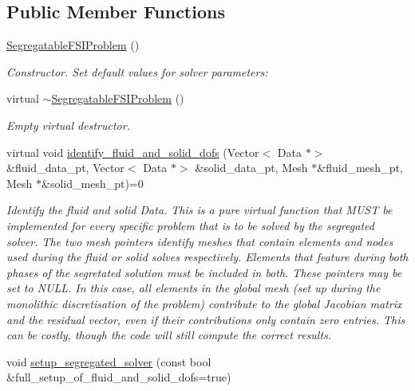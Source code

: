 \subsection*{Public Member Functions}
\begin{DoxyCompactItemize}
\item 
\hyperlink{classoomph_1_1SegregatableFSIProblem_aabbe220c15e7a348a28d54be805ca8d8}{Segregatable\+F\+S\+I\+Problem} ()
\begin{DoxyCompactList}\small\item\em Constructor. Set default values for solver parameters\+: \end{DoxyCompactList}\item 
virtual \hyperlink{classoomph_1_1SegregatableFSIProblem_aa3c69a4078b02d251e4532e73d5820aa}{$\sim$\+Segregatable\+F\+S\+I\+Problem} ()
\begin{DoxyCompactList}\small\item\em Empty virtual destructor. \end{DoxyCompactList}\item 
virtual void \hyperlink{classoomph_1_1SegregatableFSIProblem_a60f719990547949019c8645a4b3a6c6e}{identify\+\_\+fluid\+\_\+and\+\_\+solid\+\_\+dofs} (Vector$<$ Data $\ast$$>$ \&fluid\+\_\+data\+\_\+pt, Vector$<$ Data $\ast$$>$ \&solid\+\_\+data\+\_\+pt, Mesh $\ast$\&fluid\+\_\+mesh\+\_\+pt, Mesh $\ast$\&solid\+\_\+mesh\+\_\+pt)=0
\begin{DoxyCompactList}\small\item\em Identify the fluid and solid Data. This is a pure virtual function that M\+U\+ST be implemented for every specific problem that is to be solved by the segregated solver. The two mesh pointers identify meshes that contain elements and nodes used during the fluid or solid solves respectively. Elements that feature during both phases of the segretated solution must be included in both. These pointers may be set to N\+U\+LL. In this case, all elements in the global mesh (set up during the monolithic discretisation of the problem) contribute to the global Jacobian matrix and the residual vector, even if their contributions only contain zero entries. This can be costly, though the code will still compute the correct results. \end{DoxyCompactList}\item 
void \hyperlink{classoomph_1_1SegregatableFSIProblem_a12e662227e5daf656244a531f40022f9}{setup\+\_\+segregated\+\_\+solver} (const bool \&full\+\_\+setup\+\_\+of\+\_\+fluid\+\_\+and\+\_\+solid\+\_\+dofs=true)

\end{DoxyCompactItemize}
